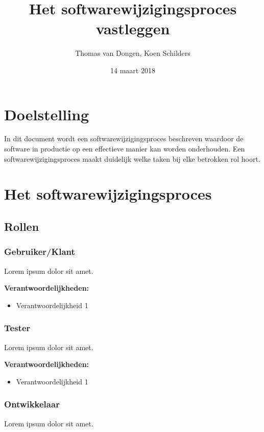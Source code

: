 \documentclass[12pt]{article}
\title{Het softwarewijzigingsproces vastleggen}
\author{Thomas van Dongen, Koen Schilders}
\date{14 maart 2018}
\begin{document}
\begin{titlepage}
\maketitle
\end{titlepage}


\section{Doelstelling}
In dit document wordt een softwarewijzigingsproces beschreven waardoor de software in productie op een effectieve manier kan worden onderhouden. Een softwarewijzigingsproces maakt duidelijk welke taken bij elke betrokken rol hoort.


\section{Het softwarewijzigingsproces}
\subsection{Rollen}
\subsubsection{Gebruiker/Klant}
Lorem ipsum dolor sit amet.

\medskip
\noindent\textbf{Verantwoordelijkheden:}
\begin{itemize}
	\item Verantwoordelijkheid 1
\end{itemize}

\subsubsection{Tester}
Lorem ipsum dolor sit amet.

\medskip
\noindent\textbf{Verantwoordelijkheden:}
\begin{itemize}
	\item Verantwoordelijkheid 1
\end{itemize}

\subsubsection{Ontwikkelaar}
Lorem ipsum dolor sit amet.
\end{document}
